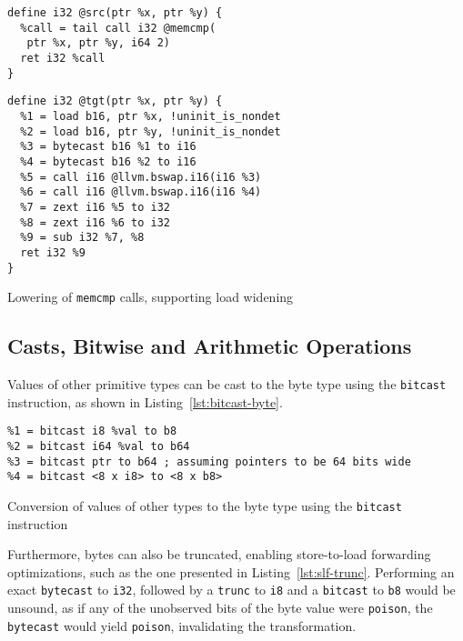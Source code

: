 \documentclass[a4paper,12pt]{article}
\begin{document}
\begin{listing}[H]
  \begin{minipage}{0.45\textwidth}
    \begin{verbatim}
define i32 @src(ptr %x, ptr %y) {
  %call = tail call i32 @memcmp(
   ptr %x, ptr %y, i64 2)
  ret i32 %call
}
    \end{verbatim}
  \end{minipage}
  \begin{minipage}{0.45\textwidth}
    \begin{verbatim}
define i32 @tgt(ptr %x, ptr %y) {
  %1 = load b16, ptr %x, !uninit_is_nondet
  %2 = load b16, ptr %y, !uninit_is_nondet
  %3 = bytecast b16 %1 to i16
  %4 = bytecast b16 %2 to i16
  %5 = call i16 @llvm.bswap.i16(i16 %3)
  %6 = call i16 @llvm.bswap.i16(i16 %4)
  %7 = zext i16 %5 to i32
  %8 = zext i16 %6 to i32
  %9 = sub i32 %7, %8
  ret i32 %9
}
    \end{verbatim}
  \end{minipage}
  \caption{Lowering of \texttt{memcmp} calls, supporting load widening}
  \label{lst:memcmp-widening}
\end{listing}

\subsection{Casts, Bitwise and Arithmetic Operations}

Values of other primitive types can be cast to the byte type using the \texttt{bitcast} instruction, as shown in Listing~\ref{lst:bitcast-byte}.

\begin{listing}[h]
  \begin{verbatim}
%1 = bitcast i8 %val to b8
%2 = bitcast i64 %val to b64
%3 = bitcast ptr to b64 ; assuming pointers to be 64 bits wide
%4 = bitcast <8 x i8> to <8 x b8>
  \end{verbatim}
  \caption{Conversion of values of other types to the byte type using the \texttt{bitcast} instruction}
  \label{lst:bitcast-byte}
\end{listing}

Furthermore, bytes can also be truncated, enabling store-to-load forwarding optimizations, such as the one presented in Listing~\ref{lst:slf-trunc}.
Performing an exact \texttt{bytecast} to \texttt{i32}, followed by a \texttt{trunc} to \texttt{i8} and a \texttt{bitcast} to \texttt{b8} would be unsound, as if any of the unobserved bits of the byte value were \texttt{poison}, the \texttt{bytecast} would yield \texttt{poison}, invalidating the transformation.
\end{document}
